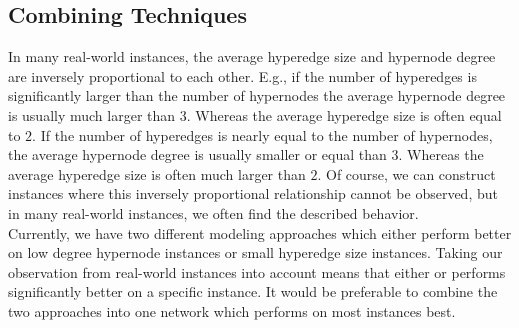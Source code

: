 \subsection{Combining Techniques}
\label{sec:hybrid_network}

In many real-world instances, the average hyperedge size and hypernode degree are inversely
proportional to each other. E.g., if the number of hyperedges is significantly larger than the
number of hypernodes the average hypernode degree is usually much larger than $3$. Whereas
the average hyperedge size is often equal to $2$. If the number of hyperedges is nearly equal
to the number of hypernodes, the average hypernode degree is usually smaller or equal than $3$. Whereas
the average hyperedge size is often much larger than $2$. Of course, we can construct instances
where this inversely proportional relationship cannot be observed, but in many real-world instances,
we often find the described behavior. \\
Currently, we have two different modeling approaches which either perform better on low degree
hypernode instances or small hyperedge size instances. Taking our observation from real-world instances 
into account means that either  or  performs significantly better on
a specific instance. It would be preferable to combine the two approaches into one network 
which performs on most instances best. \\

